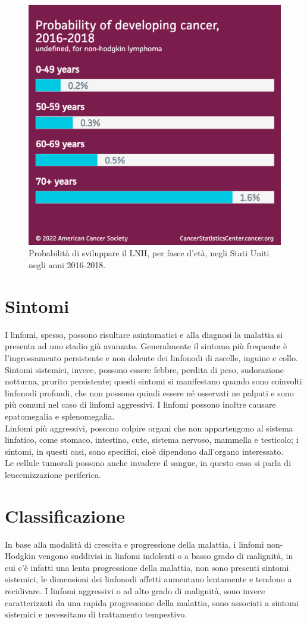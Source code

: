 \begin{figure}[H]
    \begin{center}
    \includegraphics[width=0.4\columnwidth]{img/Probabilityofdevelopingcancer.png}
    \vspace{-3mm}
    \end{center}
    \caption{Probabilità di sviluppare il LNH, per fasce d’età, negli Stati Uniti negli anni 2016-2018.
    \cite{Americanstatistic}}

\end{figure}

\section{Sintomi}
I linfomi, spesso, possono risultare asintomatici e alla diagnosi la malattia si presenta ad uno stadio già avanzato.
Generalmente il sintomo più frequente è l’ingrossamento persistente e non dolente dei linfonodi di ascelle, inguine e 
collo\cite{LNHAIL}.\\ 
Sintomi sistemici, invece, possono essere febbre, perdita di peso, sudorazione notturna, prurito persistente; 
questi sintomi si manifestano quando sono coinvolti linfonodi profondi, che non possono quindi essere né osservati 
ne palpati e sono più comuni nel caso di linfomi aggressivi. I linfomi possono inoltre causare epatomegalia e 
splenomegalia\cite{AMERICANCANCER}.\\ 
Linfomi più aggressivi, possono colpire organi che non appartengono al sistema linfatico, come stomaco, intestino, 
cute, sistema nervoso, mammella e testicolo; i sintomi, in questi casi, sono specifici, cioè dipendono 
dall’organo interessato\cite{AMERICANCANCER}.\\ 
Le cellule tumorali possono anche invadere il sangue, in questo caso si parla di leucemizzazione periferica\cite{LNHAIL}.


\section{Classificazione}
In base alla modalità di crescita e progressione della malattia, i linfomi non-Hodgkin vengono suddivisi in 
linfomi indolenti o a basso grado di malignità, in cui c’è infatti una lenta progressione della malattia, 
non sono presenti sintomi sistemici, le dimensioni dei linfonodi affetti aumentano lentamente e tendono a recidivare. 
I linfomi aggressivi o ad alto grado di malignità, sono invece caratterizzati da una rapida progressione della malattia, 
sono associati a sintomi sistemici e necessitano di trattamento tempestivo\cite{reteveneta}.\\

